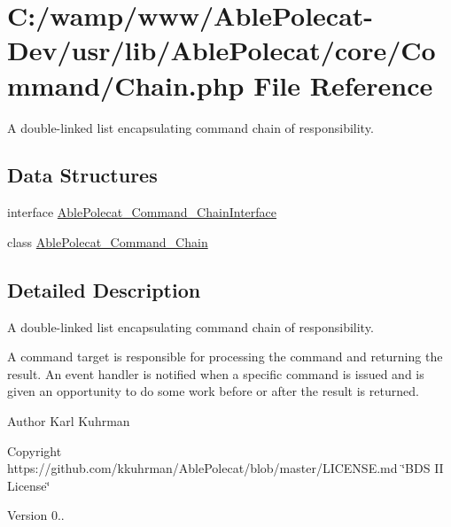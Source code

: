 \hypertarget{_chain_8php}{}\section{C\+:/wamp/www/\+Able\+Polecat-\/\+Dev/usr/lib/\+Able\+Polecat/core/\+Command/\+Chain.php File Reference}
\label{_chain_8php}


A double-\/linked list encapsulating command chain of responsibility.  


\subsection*{Data Structures}
\begin{DoxyCompactItemize}
\item 
interface \hyperlink{interface_able_polecat___command___chain_interface}{Able\+Polecat\+\_\+\+Command\+\_\+\+Chain\+Interface}
\item 
class \hyperlink{class_able_polecat___command___chain}{Able\+Polecat\+\_\+\+Command\+\_\+\+Chain}
\end{DoxyCompactItemize}


\subsection{Detailed Description}
A double-\/linked list encapsulating command chain of responsibility. 

A command target is responsible for processing the command and returning the result. An event handler is notified when a specific command is issued and is given an opportunity to do some work before or after the result is returned.

\begin{DoxyAuthor}{Author}
Karl Kuhrman 
\end{DoxyAuthor}
\begin{DoxyCopyright}{Copyright}
https\+://github.com/kkuhrman/\+Able\+Polecat/blob/master/\+L\+I\+C\+E\+N\+S\+E.\+md \char`\"{}\+B\+D\+S I\+I License\char`\"{} 
\end{DoxyCopyright}
\begin{DoxyVersion}{Version}
0.. 
\end{DoxyVersion}
